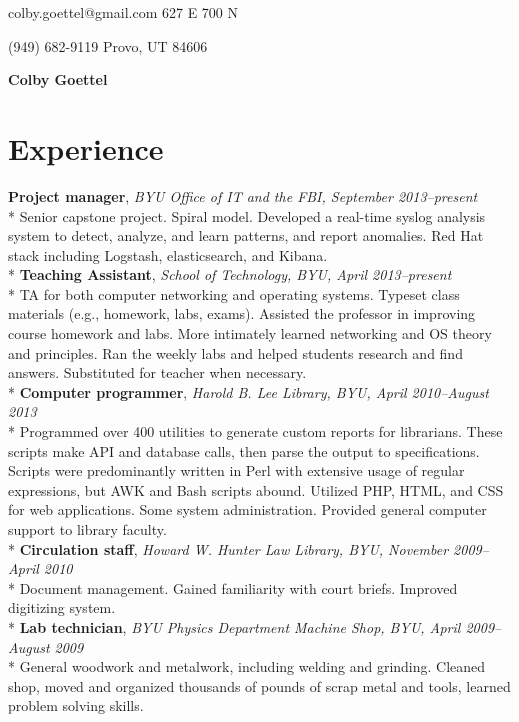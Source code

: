\documentclass[10pt]{article}
\begin{document}
{\noindent colby.goettel@gmail.com \hfill 627 E 700 N}

{\noindent (949) 682-9119 \hfill Provo, UT 84606}
\begin{center}
    {\bfseries \huge Colby Goettel} \\
\end{center}
\vspace{-18pt}

\section*{Experience}
\textbf{Project manager}, \textit{BYU Office of IT and the FBI, September 2013--present} \\*
Senior capstone project. Spiral model. Developed a real-time syslog analysis system to detect, analyze, and learn patterns, and report anomalies. Red Hat stack including Logstash, elasticsearch, and Kibana. \vspace{0.5em}\\*
\textbf{Teaching Assistant}, \textit{School of Technology, BYU, April 2013--present} \\*
TA for both computer networking and operating systems. Typeset class materials (e.g., homework, labs, exams). Assisted the professor in improving course homework and labs. More intimately learned networking and OS theory and principles. Ran the weekly labs and helped students research and find answers. Substituted for teacher when necessary. \vspace{0.5em}\\*
\textbf{Computer programmer}, \textit{Harold B. Lee Library, BYU, April 2010--August 2013} \\*
Programmed over 400 utilities to generate custom reports for librarians. These scripts make API and database calls, then parse the output to specifications. Scripts were predominantly written in Perl with extensive usage of regular expressions, but AWK and Bash scripts abound. Utilized PHP, HTML, and CSS for web applications. Some system administration. Provided general computer support to library faculty. \vspace{0.5em}\\*
\textbf{Circulation staff}, \textit{Howard W. Hunter Law Library, BYU, November 2009--April 2010} \\*
Document management. Gained familiarity with court briefs. Improved digitizing system. \vspace{0.5em}\\*
\textbf{Lab technician}, \textit{BYU Physics Department Machine Shop, BYU, April 2009--August 2009} \\*
General woodwork and metalwork, including welding and grinding. Cleaned shop, moved and organized thousands of pounds of scrap metal and tools, learned problem solving skills.
\end{document}
